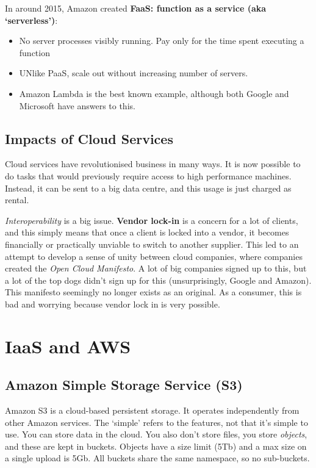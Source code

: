 \documentclass[11pt,a4paper,titlepage,dvipsnames,cmyk]{scrartcl}
\begin{document}
In around 2015, Amazon created \textbf{FaaS: function as a service (aka `serverless')}:
\begin{itemize}
    \item No server processes visibly running. Pay only for the time spent executing a function
    \item UNlike PaaS, scale out without increasing number of servers.
    \item Amazon Lambda is the best known example, although both Google and Microsoft have answers to this.
\end{itemize}

\subsection{Impacts of Cloud Services}
Cloud services have revolutionised business in many ways. It is now possible to do tasks that would previously require access to high performance machines. Instead, it can be sent to a big data centre, and this usage is just charged as rental.

\textit{Interoperability} is a big issue. \textbf{Vendor lock-in} is a concern for a lot of clients, and this simply means that once a client is locked into a vendor, it becomes financially or practically unviable to switch to another supplier. This led to an attempt to develop a sense of unity between cloud companies, where companies created the \textit{Open Cloud Manifesto}. A lot of big companies signed up to this, but a lot of the top dogs didn't sign up for this (unsurprisingly, Google and Amazon). This manifesto seemingly no longer exists as an original. As a consumer, this is bad and worrying because vendor lock in is very possible.

\section{IaaS and AWS}
\subsection{Amazon Simple Storage Service (S3)}
Amazon S3 is a cloud-based persistent storage. It operates independently from other Amazon services. The `simple' refers to the features, not that it's simple to use. You can store data in the cloud. You also don't store files, you store \textit{objects}, and these are kept in buckets. Objects have a size limit (5Tb) and a max size on a single upload is 5Gb. All buckets share the same namespace, so no sub-buckets.
\end{document}
